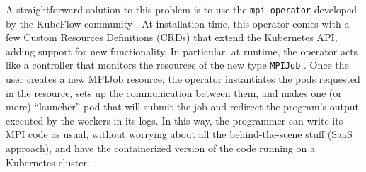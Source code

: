 A straightforward solution to this problem is to use the \texttt{mpi-operator}
developed by the KubeFlow community \cite{kubeflow-mpioperator}. At installation
time, this operator comes with a few Custom Resources Definitions (CRDs) that
extend the Kubernetes API, adding support for new functionality. In particular,
at runtime, the operator acts like a controller that monitors the resources of
the new type \texttt{MPIJob} \cite{redhat-mpioperator}. Once the user creates a
new MPIJob resource, the operator instantiates the pods requested in the
resource, sets up the communication between them, and makes one (or more)
``launcher'' pod that will submit the job and redirect the program's output
executed by the workers in its logs. In this way, the programmer can write its
MPI code as usual, without worrying about all the behind-the-scene stuff (SaaS
approach), and have the containerized version of the code running on a
Kubernetes cluster.


